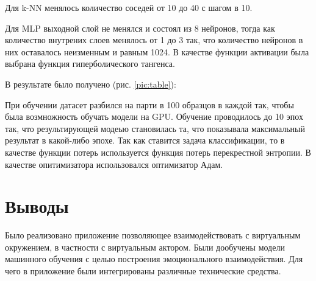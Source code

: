 Для k-NN менялось количество соседей от 10 до 40 с шагом в 10.


Для MLP выходной слой не менялся и состоял из 8 нейронов, тогда как количество внутрених слоев менялось от 1 до 3 так,
что количество нейронов в них оставалось неизменным и равным 1024.
В качестве функции активации была выбрана функция гиперболического тангенса.

В результате было получено (рис. \ref{pic:table}):

При обучении датасет разбился на парти в 100 образцов в каждой так, чтобы была возмножность
обучать модели на GPU. Обучение проводилось до 10 эпох так, что результирующей модеью становилась та,
что показывала максимальный результат в какой-либо эпохе.
Так как ставится задача классификации, то в качестве функции потерь используется функция потерь перекрестной энтропии.
В качестве опитимизатора использовался оптимизатор Адам.

\section{Выводы}
Было реализовано приложение позволяющее взаимодействовать с виртуальным окружением, в частности с виртуальным актором. 
Были дообучены модели машинного обучения с целью построения эмоционального взаимодействия. 
Для чего в приложение были интегрированы различные технические средства.